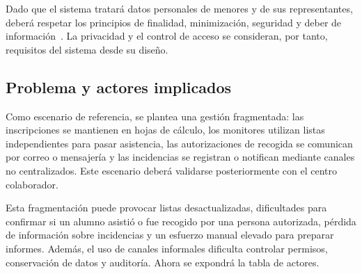 Dado que el sistema tratará datos personales de menores y de sus representantes, deberá respetar los principios de finalidad, minimización, seguridad y deber de información~\cite{ref02}. La privacidad y el control de acceso se consideran, por tanto, requisitos del sistema desde su diseño.

\subsection{Problema y actores implicados}\label{sec:1-1-2}

Como escenario de referencia, se plantea una gestión fragmentada: las inscripciones se mantienen en hojas de cálculo, los monitores utilizan listas independientes para pasar asistencia, las autorizaciones de recogida se comunican por correo o mensajería y las incidencias se registran o notifican mediante canales no centralizados. Este escenario deberá validarse posteriormente con el centro colaborador.

Esta fragmentación puede provocar listas desactualizadas, dificultades para confirmar si un alumno asistió o fue recogido por una persona autorizada, pérdida de información sobre incidencias y un esfuerzo manual elevado para preparar informes. Además, el uso de canales informales dificulta controlar permisos, conservación de datos y auditoría. Ahora se expondrá la tabla de actores.

